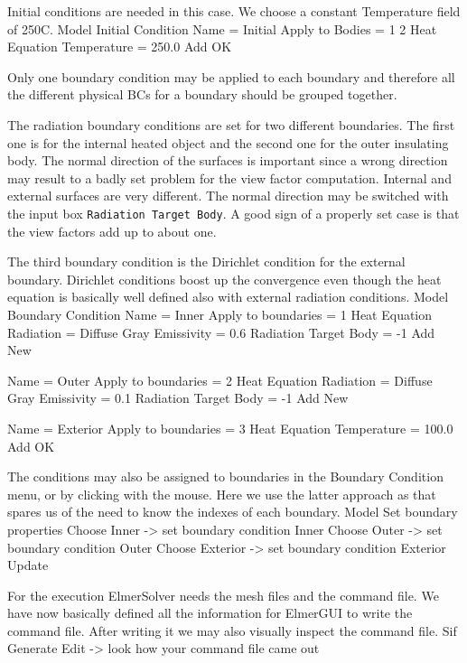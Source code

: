 Initial conditions are needed in this case. We choose a
constant Temperature field of 250C. 
\ttbegin
Model
  Initial Condition
    Name = Initial
    Apply to Bodies = 1 2
    Heat Equation
      Temperature = 250.0
    Add 
    OK
\ttend

Only one boundary condition may be applied to each boundary and therefore all the 
different physical BCs for a boundary should be grouped together. 

The radiation boundary conditions are set for two different boundaries. The first one
is for the internal heated object and the second one for the outer insulating body. 
The normal direction of the surfaces is important since a wrong direction may 
result to a badly set problem for the view factor computation. Internal and 
external surfaces are very different.  The normal direction may be switched 
with the input box \texttt{Radiation Target Body}. A good sign of a properly 
set case is that the view factors add up to about one.

The third boundary condition is the Dirichlet condition for the external boundary.
Dirichlet conditions boost up the convergence even though the heat equation 
is basically well defined also with external radiation conditions.
\ttbegin
Model
  Boundary Condition
    Name = Inner
    Apply to boundaries = 1
    Heat Equation
      Radiation = Diffuse Gray
      Emissivity = 0.6
      Radiation Target Body = -1
    Add
    New

    Name = Outer
    Apply to boundaries = 2
    Heat Equation
      Radiation = Diffuse Gray
      Emissivity = 0.1
      Radiation Target Body = -1
    Add 
    New

    Name = Exterior
    Apply to boundaries = 3
    Heat Equation
      Temperature = 100.0
    Add 
    OK
\ttend   

The conditions may also be assigned to boundaries in the Boundary Condition menu, or
by clicking with the mouse. Here we use the latter approach as that spares us of the 
need to know the indexes of each boundary.
\ttbegin
Model
  Set boundary properties
   Choose Inner -> set boundary condition Inner
   Choose Outer -> set boundary condition Outer
   Choose Exterior -> set boundary condition Exterior
  Update
\ttend


For the execution ElmerSolver needs the mesh files and the command file. 
We have now basically defined all the information for ElmerGUI to write the 
command file. After writing it we may also visually inspect the command file.
\ttbegin
Sif 
  Generate
  Edit -> look how your command file came out  
\ttend

